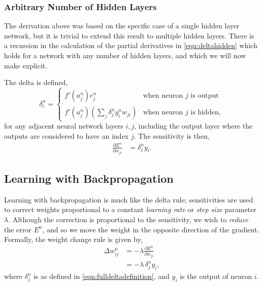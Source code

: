 \documentclass[thesis]{subfiles}
\begin{document}
\subsubsection{Arbitrary Number of Hidden Layers}
\label{arbitraryhidden}
The derivation above was based on the specific case of a single hidden layer network, but it is trivial to extend this result to multiple hidden layers. There is a recursion in the calculation of the partial derivatives in \cref{eqn:deltahidden} which holds for a network with any number of hidden layers, and which we will now make explicit. 

The delta is defined,
\begin{equation}
\delta^n_i = \begin{cases}
        f'\left( a^n_j \right) e^n_j \,& \textrm{when neuron $j$ is output}\\
        f'\left( a^n_j \right) \left( \sum_j \delta^n_j y^n_i w_{ji} \right)& \textrm{when neuron $j$ is hidden},
        \end{cases}
\label{eqn:fulldeltadefinition}
\end{equation}
for any adjacent neural network layers $i, j$, including the output layer where the outputs are considered to have an index $j$. The sensitivity is then, 
\begin{equation}
\begin{aligned}
    \frac{\partial E^n}{\partial w_{ji}} &=  \delta^n_j y_i.
     \label{eqn:sensitivity}
\end{aligned}
\end{equation}

\subsection{Learning with Backpropagation}
Learning with backpropagation is much like the delta rule; sensitivities are used to correct weights proportional to a constant \emph{learning rate} or \emph{step size} parameter $\lambda$. Although the correction is proportional to the sensitivity, we wish to \emph{reduce} the error $E^n$, and so we move the weight in the opposite direction of the gradient. Formally, the weight change rule is given by,
\begin{equation}
\begin{aligned}
    \Delta w^n_{ij} &= -\lambda \frac{\partial E^n}{\partial w_{ji}}\\
    &= -\lambda \, \delta^n_j y_i,
     \label{eqn:backproplearningrule}
\end{aligned}
\end{equation}
where $\delta^n_j$ is as defined in \cref{eqn:fulldeltadefinition}, and $y_i$ is the output of neuron $i$.
\end{document}
